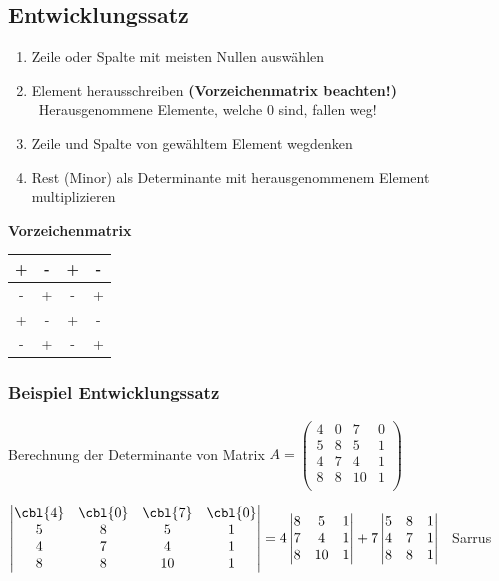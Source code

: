 \subsection{Entwicklungssatz}
		
\begin{enumerate}
	\item Zeile oder Spalte mit meisten Nullen auswählen
	\item Element herausschreiben \textbf{(Vorzeichenmatrix beachten!)} \\
		\textrightarrow\ Herausgenommene Elemente, welche 0 sind, fallen weg!
	\item Zeile und Spalte von gewähltem Element wegdenken
	\item Rest (Minor) als Determinante mit herausgenommenem Element multiplizieren
\end{enumerate}

\vspace{0.2em}
	
\textbf{Vorzeichenmatrix}
\vspace{0.2cm}
		
\begin{tabular}{| c | c | c | c |}
	\hline
	+ & - & + & - \\
	\hline
	- & + & - & + \\
	\hline
	+ & - & + & - \\
	\hline
	- & + & - & + \\
	\hline
\end{tabular}
					

\subsubsection{Beispiel Entwicklungssatz}

Berechnung der Determinante von Matrix $A =
\begin{pmatrix}
	4 & 0 & 7 & 0 \\
	5 & 8 & 5 & 1 \\
	4 & 7 & 4 & 1 \\
	8 & 8 & 10 & 1 \\
\end{pmatrix}$
				
\vspace{0.cm}
		
$\begin{vmatrix}
	\cbl{4} & \cbl{0} & \cbl{7} & \cbl{0} \\
		5 & 8 & 5  & 1 \\
		4 & 7 & 4  & 1 \\
		8 & 8 & 10 & 1 
\end{vmatrix} 
	=  4 	
\begin{vmatrix}
	8 & 5  & 1 \\
	7 & 4  & 1 \\
	8 & 10 & 1 
\end{vmatrix} 
+ 7 
\begin{vmatrix}
	5 & 8 & 1 \\
	4 & 7 & 1 \\
	8 & 8 & 1 
\end{vmatrix}$ 
\qquad \textrightarrow\ Sarrus 					 		    
		

